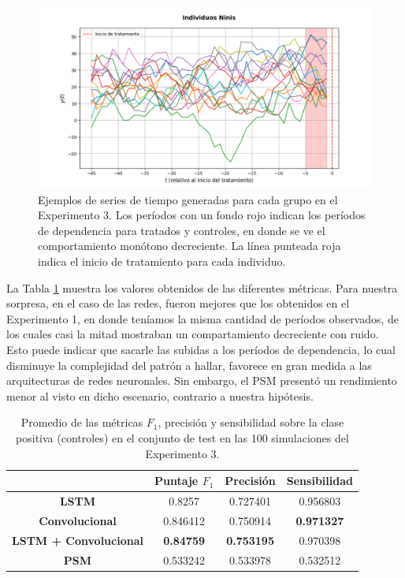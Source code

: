 \documentclass[../../main.tex]{subfiles}
\begin{document}
\begin{figure}[H]
\begin{minipage}{0.6\textwidth}
        \centering
        \includegraphics[scale=0.3]{figs/Exp3/plot_time_series_Ninis.png}
    \end{minipage}
    \caption{Ejemplos de series de tiempo generadas para cada grupo en el Experimento 3.
    Los períodos con un fondo rojo indican los períodos de dependencia para tratados y
    controles, en donde se ve el comportamiento monótono decreciente. La línea
    punteada roja indica el inicio de tratamiento para cada individuo.}
    \label{fig:time_series_exp3}
\end{figure}

La Tabla \ref{tab:results_exp3} muestra los valores obtenidos de las diferentes métricas.
Para nuestra sorpresa, en el caso de las redes, fueron mejores que los obtenidos en el
Experimento 1, en donde teníamos la misma cantidad de períodos observados, de los cuales
casi la mitad mostraban un compartamiento decreciente con ruido. Esto puede indicar que
sacarle las subidas a los períodos de dependencia, lo cual disminuye la complejidad del
patrón a hallar, favorece en gran medida a las arquitecturas de redes neuronales. Sin
embargo, el PSM presentó un rendimiento menor al visto en dicho escenario, contrario a
nuestra hipótesis.

\begin{table}[H]
    \centering
    \renewcommand{\arraystretch}{1.2}
    \begin{tabular}{|c|c|c|c|}
        \hline
         & \textbf{Puntaje} \(F_1\) & \textbf{Precisión} & \textbf{Sensibilidad} \\ \hline\hline
        \textbf{LSTM}
            & 0.8257 & 0.727401 & 0.956803 \\ \hline
        \textbf{Convolucional}
            & 0.846412 & 0.750914 & \textbf{0.971327} \\ \hline
        \textbf{LSTM + Convolucional}
            & \textbf{0.84759} & \textbf{0.753195} & 0.970398 \\ \hline
        \textbf{PSM}
            & 0.533242 & 0.533978 & 0.532512 \\
        \hline
    \end{tabular}
    \caption{Promedio de las métricas \(F_1\), precisión y sensibilidad sobre la
    clase positiva (controles) en el conjunto de test en las 100 simulaciones del
    Experimento 3.}
    \label{tab:results_exp3}
\end{table}
\end{document}
